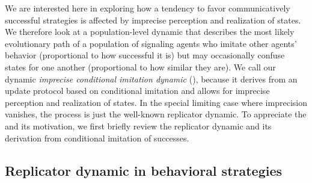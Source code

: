 \documentclass[fleqn,reqno,10pt]{article}
\newcommand{\icid}{\acro{icid}} %
\begin{document}
We are interested here in exploring how a tendency to favor communicatively successful
strategies is affected by imprecise perception and realization of states. We therefore look at
a population-level dynamic that describes the most likely evolutionary path of a population of
signaling agents who imitate other agents' behavior (proportional to how successful it is) but
may occasionally confuse states for one another (proportional to how similar they are). We call
our dynamic \emph{imprecise conditional imitation dynamic} (\icid), because it derives from an
update protocol based on conditional imitation and allows for imprecise perception and
realization of states. In the special limiting case where imprecision vanishes, the process is
just the well-known replicator dynamic. To appreciate the \icid and its motivation, we first
briefly review the replicator dynamic and its derivation from conditional imitation of
successes.



\subsection{Replicator dynamic in behavioral strategies}
\label{sec:repl-dynam-behav}
\end{document}
